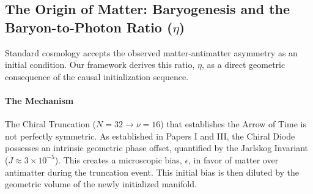 
\subsection{The Origin of Matter: Baryogenesis and the Baryon-to-Photon Ratio (\texorpdfstring{$\eta$}{eta})}
Standard cosmology accepts the observed matter-antimatter asymmetry as an initial condition. Our framework derives this ratio, $\eta$, as a direct geometric consequence of the causal initialization sequence.

\paragraph{The Mechanism}
The Chiral Truncation ($N=32 \to \nu=16$) that establishes the Arrow of Time is not perfectly symmetric. As established in Papers I and III, the Chiral Diode possesses an intrinsic geometric phase offset, quantified by the Jarlskog Invariant ($J \approx 3 \times 10^{-5}$). This creates a microscopic bias, $\epsilon$, in favor of matter over antimatter during the truncation event. This initial bias is then diluted by the geometric volume of the newly initialized manifold.

